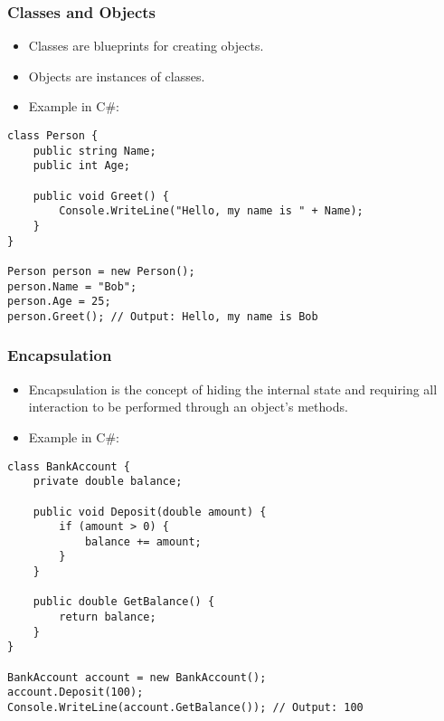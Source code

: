 \documentclass{beamer}
\begin{document}
\begin{frame}[fragile]
\frametitle{Classes and Objects}
\begin{itemize}
    \item Classes are blueprints for creating objects.
    \item Objects are instances of classes.
    \item Example in C\#:
\end{itemize}
\begin{verbatim}
class Person {
    public string Name;
    public int Age;

    public void Greet() {
        Console.WriteLine("Hello, my name is " + Name);
    }
}

Person person = new Person();
person.Name = "Bob";
person.Age = 25;
person.Greet(); // Output: Hello, my name is Bob
\end{verbatim}
\end{frame}

\begin{frame}[fragile]
\frametitle{Encapsulation}
\begin{itemize}
    \item Encapsulation is the concept of hiding the internal state and requiring all interaction to be performed through an object's methods.
    \item Example in C\#:
\end{itemize}
\begin{verbatim}
class BankAccount {
    private double balance;

    public void Deposit(double amount) {
        if (amount > 0) {
            balance += amount;
        }
    }

    public double GetBalance() {
        return balance;
    }
}

BankAccount account = new BankAccount();
account.Deposit(100);
Console.WriteLine(account.GetBalance()); // Output: 100
\end{verbatim}
\end{frame}
\end{document}
